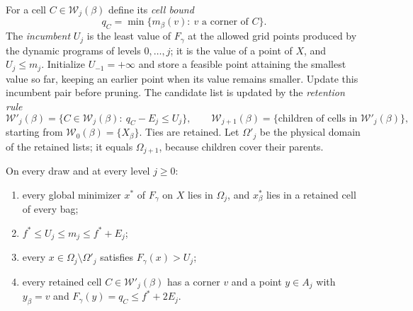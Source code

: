 For a cell $C\in\mathcal W_j(\beta)$ define its \emph{cell bound}
\[
 q_C=\min\{m_\beta(v):\ v\text{ a corner of }C\}.
\]
The \emph{incumbent} $U_j$ is the least value of $F_\gamma$ at the allowed
grid points produced by the dynamic programs of levels $0,\dots,j$; it is the
value of a point of $X$, and $U_j\le m_j$. Initialize $U_{-1}=+\infty$ and
store a feasible point attaining the smallest value so far, keeping an
earlier point when its value remains smaller. Update this incumbent pair
before pruning. The candidate list is updated by
the \emph{retention rule}
\begin{equation}\label{eq:sp:retain}
 \mathcal W'_j(\beta)=\{C\in\mathcal W_j(\beta):\ q_C-E_j\le U_j\},\qquad
 \mathcal W_{j+1}(\beta)=\{\text{children of cells in }\mathcal W'_j(\beta)\},
\end{equation}
starting from $\mathcal W_0(\beta)=\{X_\beta\}$. Ties are retained. Let
$\Omega'_j$ be the physical domain of the retained lists; it equals
$\Omega_{j+1}$, because children cover their parents.

\begin{proposition}\label{prop:sp:prune}
On every draw and at every level $j\ge0$:
\begin{enumerate}[label=(\alph*)]
\item every global minimizer $x^*$ of $F_\gamma$ on $X$ lies in $\Omega_j$,
and $x^*_\beta$ lies in a retained cell of every bag;
\item $f^*\le U_j\le m_j\le f^*+E_j$;
\item every $x\in\Omega_j\setminus\Omega'_j$ satisfies $F_\gamma(x)>U_j$;
\item every retained cell $C\in\mathcal W'_j(\beta)$ has a corner $v$ and a
point $y\in A_j$ with $y_\beta=v$ and $F_\gamma(y)=q_C\le f^*+2E_j$.
\end{enumerate}
\end{proposition}

